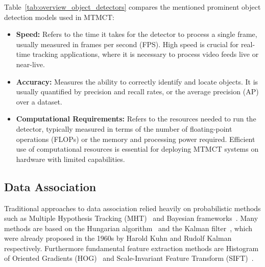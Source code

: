 \begin{table}[ht]
    \centering
    \caption{Overview Object Detectors}\label{tab:overview_object_detectors}
\end{table}

Table~\ref{tab:overview_object_detectors} compares the mentioned prominent object detection models used in MTMCT:

\begin{itemize}
    \item \textbf{Speed:} Refers to the time it takes for the detector to process a single frame, usually measured in frames per second (FPS). High speed is crucial for real-time tracking applications, where it is necessary to process video feeds live or near-live.
    \item \textbf{Accuracy:} Measures the ability to correctly identify and locate objects. It is usually quantified by precision and recall rates, or the average precision (AP) over a dataset.
    \item \textbf{Computational Requirements:} Refers to the resources needed to run the detector, typically measured in terms of the number of floating-point operations (FLOPs) or the memory and processing power required. Efficient use of computational resources is essential for deploying MTMCT systems on hardware with limited capabilities.
\end{itemize}

\subsection{Data Association}\label{subsec:data_association}
Traditional approaches to data association relied heavily on probabilistic methods such as Multiple Hypothesis Tracking (MHT)~\cite{Blackman04} and Bayesian frameworks~\cite{Reid79}. Many methods are based on the Hungarian algorithm~\cite{Kuhn55} and the Kalman filter~\cite{Kalman60}, which were already proposed in the 1960s by Harold Kuhn and Rudolf Kalman respectively. Furthermore fundamental feature extraction methods are Histogram of Oriented Gradients (HOG)~\cite{Dalal05} and Scale-Invariant Feature Transform (SIFT)~\cite{Lowe04}.

